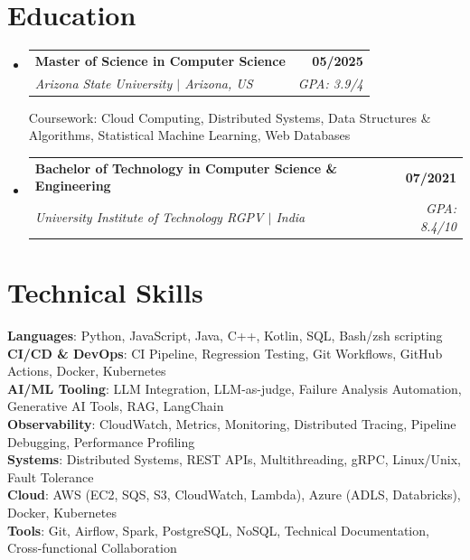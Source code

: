\documentclass[letterpaper,11pt]{article}
\makeatletter
\newcommand{\resumeSubheading}[4]{
  \item
    \begin{tabular*}{1.0\textwidth}[t]{l@{\extracolsep{\fill}}r}
      \textbf{#1} & \textbf{#2} \\
      \textit{#3} & \textit{ #4} \\
    \end{tabular*}\vspace{-7pt}
}
\newcommand{\resumeSubHeadingListStart}{\begin{itemize}[leftmargin=0.0in, label={}]}
\newcommand{\resumeSubHeadingListEnd}{\end{itemize}}
\makeatother
\begin{document}
\section{Education}
  \resumeSubHeadingListStart
    \resumeSubheading
      {Master of Science in Computer Science}{05/2025}
      {Arizona State University $|$ Arizona, US}{GPA: 3.9/4}

      \small{Coursework: Cloud Computing, Distributed Systems, Data Structures \& Algorithms, Statistical Machine Learning, Web Databases}

    \resumeSubheading
      {Bachelor of Technology in Computer Science \& Engineering}{07/2021}
      {University Institute of Technology RGPV $|$ India}{GPA: 8.4/10}
  \resumeSubHeadingListEnd

\section{Technical Skills}
\begin{itemize}[leftmargin=0in, label={}]
  \small{\item{
    \textbf{Languages}{: Python, JavaScript, Java, C++, Kotlin, SQL, Bash/zsh scripting} \\
    \textbf{CI/CD \& DevOps}{: CI Pipeline, Regression Testing, Git Workflows, GitHub Actions, Docker, Kubernetes} \\
    \textbf{AI/ML Tooling}{: LLM Integration, LLM-as-judge, Failure Analysis Automation, Generative AI Tools, RAG, LangChain} \\
    \textbf{Observability}{: CloudWatch, Metrics, Monitoring, Distributed Tracing, Pipeline Debugging, Performance Profiling} \\
    \textbf{Systems}{: Distributed Systems, REST APIs, Multithreading, gRPC, Linux/Unix, Fault Tolerance} \\
    \textbf{Cloud}{: AWS (EC2, SQS, S3, CloudWatch, Lambda), Azure (ADLS, Databricks), Docker, Kubernetes} \\
    \textbf{Tools}{: Git, Airflow, Spark, PostgreSQL, NoSQL, Technical Documentation, Cross-functional Collaboration} \\
  }}
\end{itemize}
\end{document}
